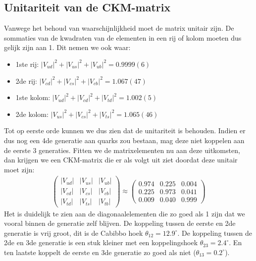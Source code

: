 \documentclass[../main.tex]{subfiles}
\begin{document}
\subsection{Unitariteit van de CKM-matrix}%
\label{sub:unitariteit_van_de_ckm_matrix}

Vanwege het behoud van waarschijnlijkheid moet de matrix unitair zijn. De sommaties van de kwadraten van de elementen in een rij of kolom moeten dus gelijk zijn aan 1. Dit nemen we ook waar:
\begin{itemize}
    \item 1ste rij: $\left|V_{u d}\right|^{2}+\left|V_{u s}\right|^{2}+\left|V_{u b}\right|^{2}=0.9999(6)$
    \item 2de rij: $\left|V_{c d}\right|^{2}+\left|V_{c s}\right|^{2}+\left|V_{c b}\right|^{2}=1.067(47)$
    \item 1ste kolom: $\left|V_{u d}\right|^{2}+\left|V_{c d}\right|^{2}+\left|V_{t d}\right|^{2}=1.002(5)$
    \item 2de kolom: $\left|V_{u s}\right|^{2}+\left|V_{c s}\right|^{2}+\left|V_{t s}\right|^{2}=1.065(46)$
\end{itemize}
Tot op eerste orde kunnen we dus zien dat de unitariteit is behouden. Indien er dus nog een 4de generatie aan quarks zou bestaan, mag deze niet koppelen aan de eerste 3 generaties. Fitten we de matrixelementen nu aan deze uitkomsten, dan krijgen we een CKM-matrix die er als volgt uit ziet doordat deze unitair moet zijn:
\begin{equation}
    \begin{aligned}
        \label{eq:ckm_huidig}
        \left(\begin{array}{ccc}
                \left|V_{u d}\right| & \left|V_{u s}\right| & \left|V_{u b}\right| \\
                \left|V_{c d}\right| & \left|V_{c s}\right| & \left|V_{c b}\right| \\
                \left|V_{t d}\right| & \left|V_{t s}\right| & \left|V_{t b}\right|
                \end{array}\right) \approx\left(\begin{array}{ccc}
                0.974 & 0.225 & 0.004 \\
                0.225 & 0.973 & 0.041 \\
                0.009 & 0.040 & 0.999
        \end{array}\right)
    \end{aligned}
\end{equation}
Het is duidelijk te zien aan de diagonaalelementen die zo goed als 1 zijn dat we vooral binnen de generatie zelf blijven. De koppeling tussen de eerste en 2de generatie is vrij groot, dit is de Cabibbo hoek $\theta_{12} = 12.9^\circ$. De koppeling tussen de 2de en 3de generatie is een stuk kleiner met een koppelingshoek $\theta_{23} = 2.4^\circ$. En ten laatste koppelt de eerste en 3de generatie zo goed als niet ($\theta_{13} = 0.2^\circ$).
\end{document}
